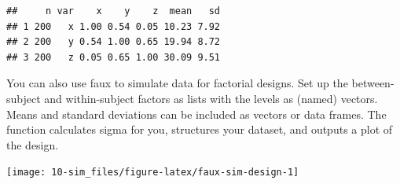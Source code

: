 \documentclass[
  oneside]{book}
\newenvironment{Shaded}{\begin{snugshade}}{\end{snugshade}}
\newcommand{\AttributeTok}[1]{\textcolor[rgb]{0.77,0.63,0.00}{#1}}
\newcommand{\DecValTok}[1]{\textcolor[rgb]{0.00,0.00,0.81}{#1}}
\newcommand{\FunctionTok}[1]{\textcolor[rgb]{0.00,0.00,0.00}{#1}}
\newcommand{\NormalTok}[1]{#1}
\newcommand{\OtherTok}[1]{\textcolor[rgb]{0.56,0.35,0.01}{#1}}
\newcommand{\SpecialCharTok}[1]{\textcolor[rgb]{0.00,0.00,0.00}{#1}}
\newcommand{\StringTok}[1]{\textcolor[rgb]{0.31,0.60,0.02}{#1}}
\begin{document}
\begin{verbatim}
##     n var    x    y    z  mean   sd
## 1 200   x 1.00 0.54 0.05 10.23 7.92
## 2 200   y 0.54 1.00 0.65 19.94 8.72
## 3 200   z 0.05 0.65 1.00 30.09 9.51
\end{verbatim}

You can also use faux to simulate data for factorial designs. Set up the between-subject and within-subject factors as lists with the levels as (named) vectors. Means and standard deviations can be included as vectors or data frames. The function calculates sigma for you, structures your dataset, and outputs a plot of the design.

\begin{Shaded}
\end{Shaded}

\begin{center}\texttt{[image: 10-sim\_files/figure-latex/faux-sim-design-1]} \end{center}
\end{document}
